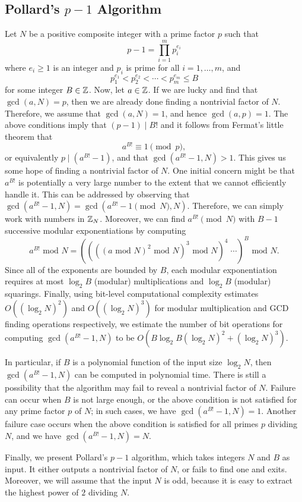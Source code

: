 \subsection{Pollard's $p-1$ Algorithm}
Let $N$ be a positive composite integer with a prime factor $p$ such that 
\[ p-1 = \prod_{i=1}^m p_i^{e_i} \] 
where $e_i \geq 1$ is an integer and $p_i$ is prime for all $i = 1, \dots, m$, and 
\[ p_1^{e_1} < p_2^{e_2} < \cdots < p_m^{e_m} \leq B \] 
for some integer $B \in \mathbb{Z}$. Now, let $a \in \mathbb{Z}$. If we are lucky and find that 
$\gcd(a, N) = p$, then we are already done finding a nontrivial factor of $N$. 
Therefore, we assume that $\gcd(a, N) = 1$, and hence $\gcd(a, p) = 1$. 
The above conditions imply that $(p-1) \mid B!$ and it follows from Fermat's 
little theorem that 
\[ a^{B!} \equiv 1 \pmod p, \] 
or equivalently $p \mid (a^{B!} - 1)$, and that $\gcd(a^{B!} - 1, N) > 1$. 
This gives us some hope of finding a nontrivial factor of $N$. One 
initial concern might be that $a^{B!}$ is potentially a very large number 
to the extent that we cannot efficiently handle it. This can be addressed by 
observing that $\gcd(a^{B!}-1, N) = \gcd(a^{B!}-1 \pmod N, N)$. Therefore, 
we can simply work with numbers in $\mathbb{Z}_N$. Moreover, we can find
$a^{B!} \pmod N$ with $B-1$ successive modular exponentiations by computing 
\[ a^{B!} \text{ mod $N$} = ((((a \text{ mod $N$})^2 \text{ mod $N$})^3
\text{ mod $N$})^4 \;\cdots)^B \text{ mod $N$}. \] 
Since all of the exponents are bounded by $B$, each modular exponentiation 
requires at most $\log_2 B$ (modular) multiplications and $\log_2 B$ 
(modular) squarings. Finally, using bit-level computational complexity 
estimates $O((\log_2 N)^2)$ and $O((\log_2 N)^3)$ for modular multiplication 
and GCD finding operations respectively, we estimate 
the number of bit operations for computing $\gcd(a^{B!}-1, N)$ to be 
$O(B\log_2 B (\log_2 N)^2 + (\log_2 N)^3)$. 

In particular, if $B$ is a polynomial function of the input size 
$\log_2 N$, then $\gcd(a^{B!} - 1, N)$ can be computed in polynomial time. 
There is still a possibility that the algorithm may fail to reveal a 
nontrivial factor of $N$. Failure can occur when $B$ is not large enough, or the 
above condition is not satisfied for any prime factor $p$ of $N$; in such 
cases, we have $\gcd(a^{B!} - 1, N) = 1$. Another failure case occurs when 
the above condition is satisfied for all primes $p$ dividing $N$, and 
we have $\gcd(a^{B!} - 1, N) = N$.  

Finally, we present Pollard's $p-1$ algorithm, which takes integers $N$ and 
$B$ as input. It either outputs a nontrivial factor of $N$, or fails to find 
one and exits. Moreover, we will assume that the input $N$ is odd, because 
it is easy to extract the highest power of $2$ dividing $N$. 

